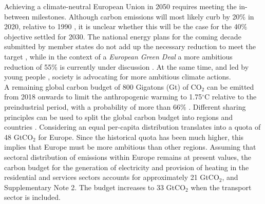 \documentclass[5p]{elsarticle} %
\begin{document}

Achieving a climate-neutral European Union in 2050 \cite{in-depth_2018} requires meeting the in-between milestones. Although carbon emissions will most likely curb by 20\% in 2020, relative to 1990 \cite{EEA_totalGHG}, it is unclear whether this will be the case for the 40\% objective settled for 2030. The national energy plans for the coming decade submitted by member states do not add up the necessary reduction to meet the target \cite{EU-appraisal_2019}, while in the context of a \textit{European Green Deal} a more ambitious reduction of 55\% is currently under discussion \cite{GreenDeal}. At the same time, and led by young people \cite{Warren_2019}, society is advocating for more ambitious climate actions. \\ %

A remaining global carbon budget of 800 Gigatons (Gt) of CO$_2$ can be emitted from 2018 onwards to limit the anthropogenic warming to 1.75$^{\circ}$C relative to the preindustrial period, with a probability of more than 66\% \cite{IPCC_1.5}. Different sharing principles can be used to split the global carbon budget into regions and countries \cite{Raupach_2014}. Considering an equal per-capita distribution translates into a quota of 48 GtCO$_2$ for Europe. Since the historical quota has been much higher, this implies that Europe must be more ambitious than other regions. Assuming that sectoral distribution of emissions within Europe remains at present values, the carbon budget for the generation of electricity and provision of heating in the residential and services sectors accounts for approximately 21 GtCO$_2$, \cite{UNFCCC_inventory} and Supplementary Note 2. The budget increases to 33 GtCO$_2$ when the transport sector is included. \\ %
\end{document}
